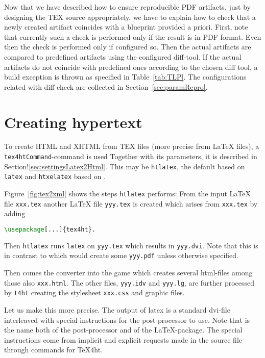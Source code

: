 Now that we have described how to ensure reproducible PDF artifacts, 
just by designing the TEX source appropriately, 
we have to explain how to check that a newly created artifact 
coincides with a blueprint provided a priori. 
First, note that currently such a check is performed 
only if the result is in PDF format. 
Even then the check is performed only if configured so. 
Then the actual artifacts are compared to predefined artifacts 
using the configured diff-tool. 
If the actual artifacts do not coincide with predefined ones 
according to the chosen diff tool, 
a build exception is thrown as specified in Table~\ref{tab:TLP}. 
The configurations related with diff check are collected in Section~\ref{sec:paramRepro}. 



\section{Creating hypertext}\label{sec:tex2html}

To create HTML and XHTML from TEX files (more precise from \LaTeX{} files), 
a \texttt{tex4htCommand}-command is used 
Together with its parameters, 
it is described in Section!\ref{sec:settingsLatex2Html}. 
This may be \texttt{htlatex}, the default based on \texttt{latex} 
and \texttt{htxelatex} based on \xelatex. 

Figure~\ref{fig:tex2xml} shows the steps \texttt{htlatex} performs: 
From the input \LaTeX{} file \texttt{xxx.tex} 
another \LaTeX{} file \texttt{yyy.tex} is created 
which arises from \texttt{xxx.tex} by adding 
\begin{lstlisting}[language=TeX]
\usepackage[...]{tex4ht}. 
\end{lstlisting}
%
Then \texttt{htlatex} runs \texttt{latex} on \texttt{yyy.tex} 
which results in \texttt{yyy.dvi}. 
Note that this is in contrast to \lualatex{} 
which would create some \texttt{yyy.pdf} unless otherwise specified. 

Then comes the converter  into the game 
which creates several html-files among those also \texttt{xxx.html}. 
The other files, \texttt{yyy.idv} and \texttt{yyy.lg}, 
are further processed by \texttt{t4ht} 
creating the stylesheet \texttt{xxx.css} and graphic files. 
\medskip


Let us make this more precise. 
The output of latex is a standard \gls{dvi}-file 
interleaved with special instructions 
for the post-processor  to use. 
Note that  is the name both of the post-processor 
and of the \LaTeX-package. 
The special instructions come from implicit and explicit requests 
made in the source file through commands for TeX4ht. 

